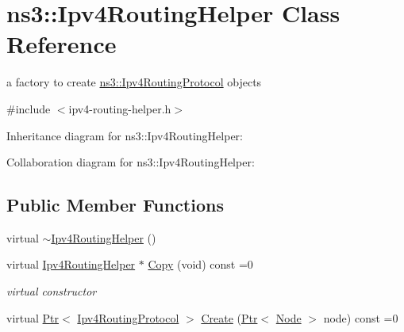 \hypertarget{classns3_1_1Ipv4RoutingHelper}{}\section{ns3\+:\+:Ipv4\+Routing\+Helper Class Reference}
\label{classns3_1_1Ipv4RoutingHelper}


a factory to create \hyperlink{classns3_1_1Ipv4RoutingProtocol}{ns3\+::\+Ipv4\+Routing\+Protocol} objects  




{\ttfamily \#include $<$ipv4-\/routing-\/helper.\+h$>$}



Inheritance diagram for ns3\+:\+:Ipv4\+Routing\+Helper\+:


Collaboration diagram for ns3\+:\+:Ipv4\+Routing\+Helper\+:
\subsection*{Public Member Functions}
\begin{DoxyCompactItemize}
\item 
virtual \hyperlink{classns3_1_1Ipv4RoutingHelper_a66f82dc0628b52ad186c7c73e4cd096e}{$\sim$\+Ipv4\+Routing\+Helper} ()
\item 
virtual \hyperlink{classns3_1_1Ipv4RoutingHelper}{Ipv4\+Routing\+Helper} $\ast$ \hyperlink{classns3_1_1Ipv4RoutingHelper_acf569a0ecf95d5b5186456f368eaa465}{Copy} (void) const =0
\begin{DoxyCompactList}\small\item\em virtual constructor \end{DoxyCompactList}\item 
virtual \hyperlink{classns3_1_1Ptr}{Ptr}$<$ \hyperlink{classns3_1_1Ipv4RoutingProtocol}{Ipv4\+Routing\+Protocol} $>$ \hyperlink{classns3_1_1Ipv4RoutingHelper_aa00350f9ab9f2ea2ff83f6ef04dae209}{Create} (\hyperlink{classns3_1_1Ptr}{Ptr}$<$ \hyperlink{classns3_1_1Node}{Node} $>$ node) const =0
\end{DoxyCompactItemize}
